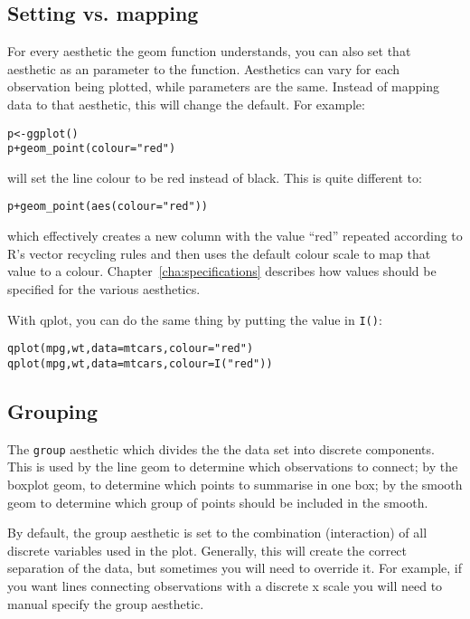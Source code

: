 \subsection{Setting vs. mapping}
\label{sub:setting-mapping}

For every aesthetic the geom function understands, you can also set that aesthetic as an parameter to the function.  Aesthetics can vary for each observation being plotted, while parameters are the same.  Instead of mapping data to that aesthetic, this will change the default.  For example:

\begin{alltt}
p <- ggplot()
p + geom_point(colour="red")  
\end{alltt}

\noindent will set the line colour to be red instead of black.  This is quite different to:

\begin{alltt}
p + geom_point(aes(colour="red"))
\end{alltt}

\noindent which effectively creates a new column with the value ``red'' repeated according to R's vector recycling rules and then uses the default colour scale to map that value to a colour. Chapter~\ref{cha:specifications} describes how values should be specified for the various aesthetics.  

With qplot, you can do the same thing by putting the value in {\tt I()}:

\begin{alltt}
  qplot(mpg, wt, data=mtcars, colour = "red")
  qplot(mpg, wt, data=mtcars, colour = I("red"))
\end{alltt}


\subsection{Grouping}
\label{sub:grouping}

The {\tt group} aesthetic which divides the the data set into discrete components.   This is used by the line geom to determine which observations to connect; by the boxplot geom, to determine which points to summarise in one box; by the smooth geom to determine which group of points should be included in the smooth.

By default, the group aesthetic is set to the combination (interaction) of all discrete variables used in the plot.  Generally, this will create the correct separation of the data, but sometimes you will need to override it.  For example, if you want lines connecting observations with a discrete x scale you will need to manual specify the group aesthetic.  


